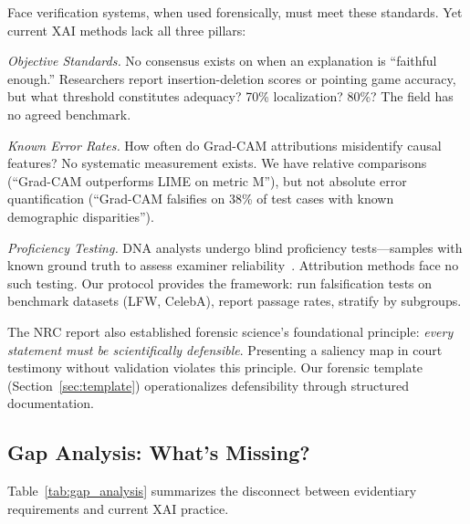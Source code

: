 Face verification systems, when used forensically, must meet these standards. Yet current XAI methods lack all three pillars:

\textit{Objective Standards.} No consensus exists on when an explanation is ``faithful enough.'' Researchers report insertion-deletion scores or pointing game accuracy, but what threshold constitutes adequacy? 70\% localization? 80\%? The field has no agreed benchmark.

\textit{Known Error Rates.} How often do Grad-CAM attributions misidentify causal features? No systematic measurement exists. We have relative comparisons (``Grad-CAM outperforms LIME on metric M''), but not absolute error quantification (``Grad-CAM falsifies on 38\% of test cases with known demographic disparities'').

\textit{Proficiency Testing.} DNA analysts undergo blind proficiency tests—samples with known ground truth to assess examiner reliability~\cite{nrc2009forensics}. Attribution methods face no such testing. Our protocol provides the framework: run falsification tests on benchmark datasets (LFW, CelebA), report passage rates, stratify by subgroups.

The NRC report also established forensic science's foundational principle: \textit{every statement must be scientifically defensible}. Presenting a saliency map in court testimony without validation violates this principle. Our forensic template (Section~\ref{sec:template}) operationalizes defensibility through structured documentation.

\subsection{Gap Analysis: What's Missing?}

Table~\ref{tab:gap_analysis} summarizes the disconnect between evidentiary requirements and current XAI practice.

